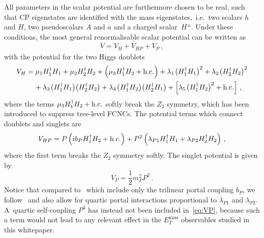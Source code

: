 \documentclass[a4paper, 11pt,notoc]{article}
\newcommand{\MET}{\ensuremath{E_T^\mathrm{miss}}\xspace}
\begin{document}
All parameters in the scalar potential are furthermore chosen to be real, such that CP eigenstates are identified with the mass eigenstates,~i.e.~two scalars $h$ and $H$, two pseudoscalars $A$ and $a$ and a charged scalar~$H^\pm$. Under these conditions, the most general renormalisable scalar potential can be written as 
\begin{align} \label{eq:V2HDMa}
V=V_H+V_{HP}+V_P\,,
\end{align}
with the potential for the two Higgs doublets
\begin{equation}\label{eq:VH}
\begin{split}
V_{H} & = \mu_1 H_1^\dagger H_1 + \mu_2 H_2^\dagger H_2 + \left ( \mu_3  H_1^\dagger H_2 + {\rm h.c.} \right ) + \lambda_1  \hspace{0.25mm} \big ( H_1^\dagger H_1  \big )^2  + \lambda_2  \hspace{0.25mm} \big ( H_2^\dagger H_2 \big  )^2  \\
& \phantom{xx} +  \lambda_3 \hspace{0.25mm} \big ( H_1^\dagger H_1  \big ) \big ( H_2^\dagger H_2  \big ) + \lambda_4  \hspace{0.25mm} \big ( H_1^\dagger H_2  \big ) \big ( H_2^\dagger H_1  \big ) + \left [ \lambda_5   \hspace{0.25mm} \big ( H_1^\dagger H_2 \big )^2 + {\rm h.c.} \right ]  \,,
\end{split}
\end{equation}
where the terms $\mu_3  H_1^\dagger H_2 + {\rm h.c.}$  softly break the  $Z_2$ symmetry, which has been introduced to suppress tree-level FCNCs. The potential terms which connect doublets and singlets are 
\begin{equation} \label{eq:VHP}
\begin{split}
V_{HP}  = P \left ( i  b_P   H_1^\dagger H_2 + {\rm h.c.} \right ) + P^2 \left (  \lambda_{P1}  H_1^\dagger H_1 +   \lambda_{P2}    H_2^\dagger H_2 \right )  \,,
\end{split} 
\end{equation}
where the first term breaks the  $Z_2$ symmetry softly.  The singlet potential is given by 
\begin{equation} \label{eq:VP}
V_{P}  =  \frac{1}{2}  m_P^2  P^2  \,.
\end{equation}
Notice  that compared to~\cite{Ipek:2014gua,No:2015xqa,Goncalves:2016iyg,Tunney:2017yfp} which include only the trilinear portal coupling $b_P$, we  follow~\cite{Bauer:2017ota} and also allow for quartic portal interactions proportional to $\lambda_{P1}$ and  $\lambda_{P2}$. A~quartic self-coupling $P^4$ has instead not been included in~\eqref{eq:VP}, because such a term would not lead to any relevant effect in the $\MET$ observables studied in this whitepaper.
\end{document}
